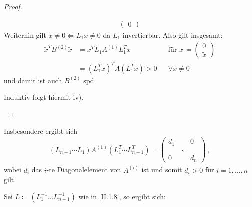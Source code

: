 \begin{proof}
\begin{enumerate}[i)]
\begin{align*}
\begin{pmatrix}
		0
      \end{pmatrix} 
    \end{align*}
    Weiterhin gilt
    $ x\neq 0 \Longleftrightarrow L_1 x\neq 0$
    da $L_1$ invertierbar. Also gilt insgesamt:
    \begin{align*}
      \tilde{x}^TB^{(2)} \tilde{x} &= x^T L_1A^{(1)}L_1^Tx
      &&  \text{für } x\coloneqq \begin{pmatrix}0\\\tilde{x}\end{pmatrix}\\
                                   &= (L_1^Tx)^TA(L_1^Tx) > 0
      && \forall \tilde{x}\neq 0 
    \end{align*}
    und damit ist auch $B^{(2)}$ spd.
    
    Induktiv folgt hiermit iv).
  \end{enumerate}
\end{proof}

Insbesondere ergibt sich
\begin{gather*}
  (L_{n-1}\dotsm L_1)A^{(1)}(L_1^T\dotsm L_{n-1}^T) 
  = \begin{pmatrix} d_1 & & 0 \\ &\ddots& \\ 0&& d_n\end{pmatrix} \, ,
\end{gather*}
wobei $d_i$ das $i$-te Diagonalelement von $A^{(i)}$ 
ist und somit $d_i>0$ für $ i= 1, \dotsc , n$ gilt. 

Sei $L\coloneqq (L_1^{-1}\dotsc L_{n-1}^{-1})$ 
wie in \eqref{II.1.8}, so ergibt sich:


